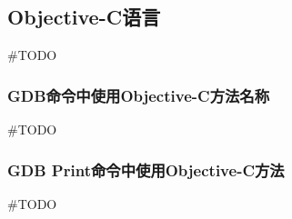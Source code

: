 \subsection{Objective-C语言}
\#TODO

\subsubsection{GDB命令中使用Objective-C方法名称}
\#TODO

\subsubsection{GDB Print命令中使用Objective-C方法}
\#TODO
